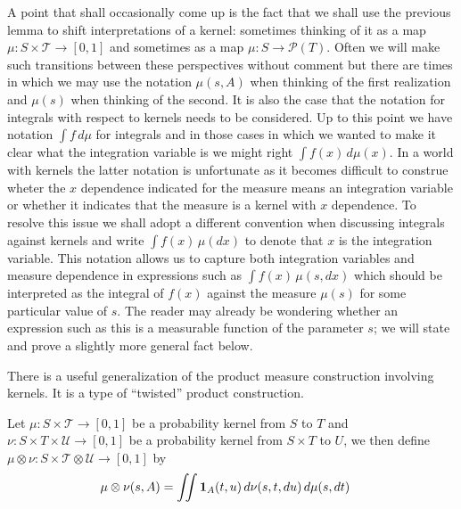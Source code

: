 A point that shall occasionally come up is the fact that we shall use
the previous lemma to shift interpretations of a kernel: sometimes
thinking of it as a map $\mu : S \times \mathcal{T} \to [0,1]$ and
sometimes as a map $\mu : S \to \mathcal{P}(T)$.  Often we will make
such transitions between these perspectives without  comment but there
are times in which we may use the notation $\mu(s,A)$ when thinking of
the first realization and $\mu(s)$ when thinking of the second.  It is
also the case that the notation for integrals with respect to kernels
needs to be considered.  Up to this point we have notation $\int f \,
d\mu$ for integrals and in those cases in which we wanted to make it
clear what the integration variable is we might right $\int f(x) \,
d\mu(x)$.  In a world with kernels the latter notation is unfortunate
as it becomes difficult to construe wheter the $x$ dependence indicated
for the measure means an integration variable or whether it
indicates that the measure is a kernel with $x$ dependence.  To resolve
this issue we shall adopt a different convention when discussing
integrals against kernels and write $\int f(x) \, \mu(dx)$ to denote
that $x$ is the integration variable.  This notation allows us to
capture both integration variables and measure dependence in
expressions such as $\int f(x) \, \mu(s, dx)$ which should be
interpreted as the integral of $f(x)$ against the measure $\mu(s)$ for
some particular value of $s$.  The reader may already be wondering
whether an expression such as this is a measurable function of the
parameter $s$; we will state and prove a slightly more general
fact below.

There is a useful generalization of the product measure construction
involving kernels.  It is a type of ``twisted'' product construction.
\begin{defn}Let $\mu : S \times \mathcal{T} \to [0,1]$ be a
  probability kernel from $S$ to $T$ and $\nu : S \times T \times
  \mathcal{U} \to [0,1]$ be a probability kernel from $S \times T$ to
  $U$, we then define $\mu \otimes \nu : S \times \mathcal{T} \otimes
  \mathcal{U} \to [0,1]$ by
\begin{align*}
\mu \otimes \nu(s, A) &= \iint \textbf{1}_{A}(t,u) \,
d\nu(s,t,du) \, d\mu(s, dt)
\end{align*}
\end{defn}


